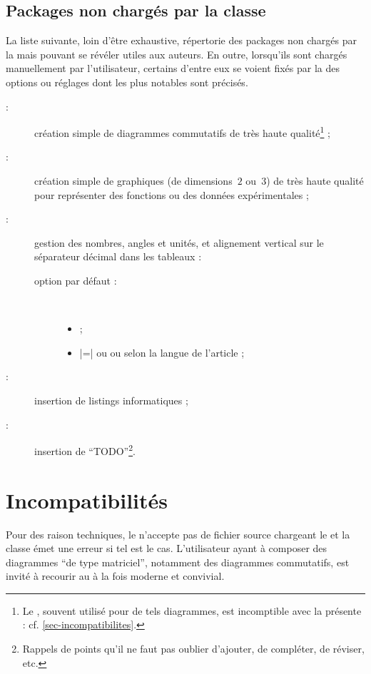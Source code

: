 \documentclass[french,nolocaltoc]{nwejmart}
\newtheorem[title=Fait,style=definition]{fact}
\begin{document}
\subsection{Packages non  chargés par la classe}\label{sec:packages-non-charges}

La liste suivante, loin d'être exhaustive, répertorie des packages non chargés
par la \nwejmauthorcl{} mais pouvant se révéler utiles aux auteurs.  En outre,
lorsqu'ils sont chargés manuellement par l'utilisateur, certains d'entre eux se
voient fixés par la \nwejmauthorcl{} des options ou réglages dont les plus
notables sont précisés.

\begin{description}
\item[ :] création simple de diagrammes commutatifs de très
  haute qualité\footnote{Le , souvent utilisé pour de tels
    diagrammes, est incomptible avec la présente :
    cf. \vref{sec-incompatibilites}.} ;
\item[ :] création simple de graphiques (de dimensions~$2$
  ou~$3$) de très haute qualité pour représenter des fonctions ou des données
  expérimentales ;
\item[ :] gestion des nombres, angles et unités, et alignement
  vertical sur le séparateur décimal dans les tableaux :
  \begin{description}
  \item[option par défaut :]\
    \begin{itemize}
    \item {} ;
    \item {}|=| ou  ou 
      selon la langue de l'article ;
    \end{itemize}
  \end{description}
\item[ :] insertion de listings informatiques ;
\item[\package{todonotes} :] insertion de \enquote{TODO}\footnote{Rappels de
    points qu'il ne faut pas oublier d'ajouter, de compléter, de réviser, etc.}.
\end{description}

\section{Incompatibilités}
\label{sec-incompatibilites}

Pour des raison techniques, le \nwejm{} n'accepte pas de fichier source
\file{.tex} chargeant le \Package{xy} et la classe \nwejmauthor{} émet une
erreur si tel est le cas. L'utilisateur ayant à composer des diagrammes
\enquote{de type matriciel}, notamment des diagrammes commutatifs, est invité
à recourir au \Package{tikz-cd} à la fois moderne et convivial.
\end{document}
